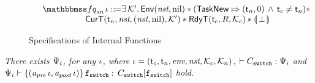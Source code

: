 \begin{figure}[!t]
\[\begin{array}{l}
            \\[-9pt]
            \quad
            \relspecpost_{\textit{sn}} \, \lgvl \define 
            \exists \, \hthrdlocalst'. \, 
            \Env{\nst, \nil} \sepstar 
            (\relmsto{\TaskNew}{(\thrdid_n, 0)} \, \land \, \thrdid_c \neq \thrdid_n) \sepstar \\
            \hspace*{6em}
            \RelCurT{\thrdid_n}{\nst}{(\nst, \nil)}{\hthrdlocalst'} 
            \sepstar \RelRdyT{\thrdid_c}{\RFile}{\hthrdlocalst_c}
            \sepstar \safePrimAst{\, \primdone \,}
        \end{array}
    \]
    \caption{Specifications of Internal Functions}
    \label{fig:Specifications of Internal Functions}
\end{figure}

\begin{lemma}
    \em
    \label{lemma:codeproof}
    There exists $\Psi_i$, for any $\iota$,
    where $\iota = (\textsf{t}_c, \textsf{t}_n, \textit{env}, \textit{nst}, \mathcal{K}_c, 
    \mathcal{K}_n)$,
    $\vdash {C_{\texttt{switch}}} : {\Psi_i}$ and 
    ${\Psi_i} \vdash \{ ({\textit{a}_\textit{pre} \, \iota}, {\textit{a}_\textit{post} \, \iota}) \} \, {\texttt{f}_{\texttt{switch}}} : \, {C_{\texttt{switch}}[\texttt{f}_{\texttt{switch}}]}$ hold. 
\end{lemma}

